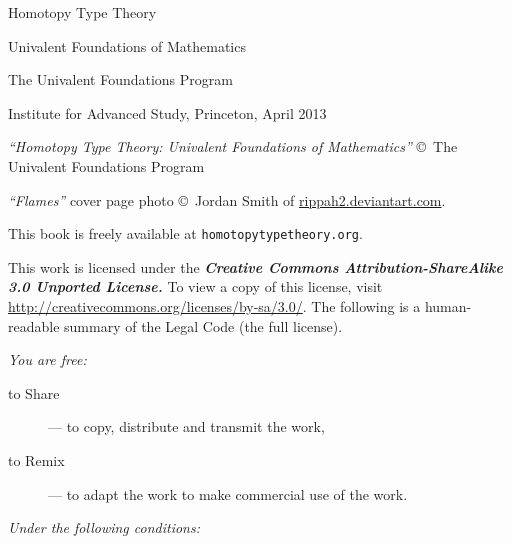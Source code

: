 \vspace*{0.2\textheight}
{\centering
{\fontsize{46}{60}\selectfont%
Homotopy Type Theory}\par
\vspace*{20pt}
{\fontsize{23}{40}\selectfont%
Univalent Foundations of Mathematics}\par}
\vfill
{\centering
{\fontsize{19}{25}\selectfont%
The Univalent Foundations Program\par
\vspace*{8pt}
Institute for Advanced Study,
Princeton, April 2013\par}
\vspace{0.03\textheight}
\hbox{}

\clearpage

%
\hbox{}
\vfill

{\footnotesize
\noindent
\emph{``Homotopy Type Theory: Univalent Foundations of Mathematics''}
\copyright\ The Univalent Foundations Program

\bigskip

\noindent
\emph{``Flames''} cover page photo
\copyright\ Jordan Smith of \href{http://rippah2.deviantart.com/}{rippah2.deviantart.com}.

\bigskip

\noindent
This book is freely available at
{\tt homotopytypetheory.org}.
%

\bigskip

\noindent
This work is licensed under the
\textbf{\emph{Creative Commons Attribution-ShareAlike 3.0 Unported License.}}
%
To view a copy of this license, visit
\href{http://creativecommons.org/licenses/by-sa/3.0/}{http://creativecommons.org/licenses/by-sa/3.0/}.
The following is a human-readable summary of the Legal Code (the full license).

\bigskip

\noindent
\emph{You are free:}
%
\begin{description}
\item[to Share] --- to copy, distribute and transmit the work,
\item[to Remix] --- to adapt the work to make commercial use of the work.
\end{description}
%
\emph{Under the following conditions:}
%
\begin{description}


\end{description}}}
